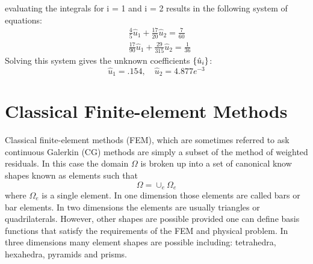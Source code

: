 evaluating the integrals for i = 1 and i = 2 results in the following system of equations:
\begin{equation}
\begin{split}
& \frac{4}{5}\hat{u}_{1} + \frac{17}{20}\hat{u}_{2} = \frac{7}{60} \\
& \frac{17}{90}\hat{u}_{1} + \frac{29}{315} \hat{u}_{2} = \frac{1}{36} 
\end{split}
\end{equation}
Solving this system gives the unknown coefficients $\left\{ \hat{u}_{i} \right\}$:
\begin{equation}
\hat{u}_{1} = .154, \quad \hat{u}_{2} = 4.877e^{-3}
\end{equation}

\section{Classical Finite-element Methods}
Classical finite-element methods (FEM), which are sometimes referred to ask continuous Galerkin (CG) methods are simply a subset of the method of weighted residuals.  In this case the domain $\Omega$ is broken up into a set of canonical know shapes known as elements such that
\begin{equation}
\Omega = \cup_{e} \Omega_{e}
\end{equation}
where $\Omega_{e}$ is a single element.  In one dimension those elements are called bars or bar elements.  In two dimensions the elements are usually triangles or quadrilaterals.  However, other shapes are possible provided one can define basis functions that satisfy the requirements of the FEM and physical problem.  In three dimensions many element shapes are possible including: tetrahedra, hexahedra, pyramids and prisms.  

